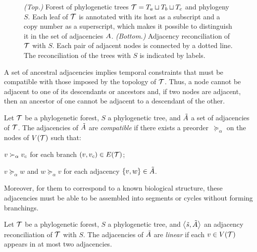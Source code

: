 \begin{figure}[htb]
    \capstart
    \centering
    
    \caption[Instance of and solution to an adjacency reconciliation problem]{
        \emph{(Top.)}
        Forest of phylogenetic trees \(\mathcal{T} = T_a \sqcup T_b \sqcup T_c\)
        and phylogeny \(S\).
        Each leaf of \(\mathcal{T}\) is annotated with its host as a subscript
        and a copy number as a superscript, which makes it possible to distinguish it in the set of adjacencies \(A\).
        \emph{(Bottom.)}
        Adjacency reconciliation of \(\mathcal{T}\) with \(S\).
        Each pair of adjacent nodes is connected by a dotted line.
        The reconciliation of the trees with \(S\) is indicated by labels.
    }
    \label{fig:reconciliation:adj-rec}
\end{figure}

A set of ancestral adjacencies implies temporal constraints that must be compatible with those imposed by the topology of \(\mathcal{T}\).
Thus, a node cannot be adjacent to one of its descendants or ancestors and, if two nodes are adjacent, then an ancestor of one cannot be adjacent to a descendant of the other.

\vspace{1ex}
\begin{definition}[Compatibility]\label{definition:adjrec-adj-compat}
    Let \(\mathcal{T}\) be a phylogenetic forest, \(S\) a phylogenetic tree, and \(\tilde{A}\) a set of adjacencies of \(\mathcal{T}\).
    The adjacencies of \(\tilde{A}\) are \emph{compatible} if there exists a preorder~\(\succeq_\alpha\) on the nodes of \(V(\mathcal{T})\) such that:
    \begin{condition}
        \item \(v \succ_\alpha v_c\) for each branch \((v, v_c) \in E(\mathcal{T})\);
        \item \(v \succeq_\alpha w\) and \(w \succeq_\alpha v\) for each adjacency \(\{v, w\} \in \tilde{A}\). \qedhere
    \end{condition}
\end{definition}

Moreover, for them to correspond to a known biological structure, these adjacencies must be able to be assembled into segments or cycles without forming branchings.

\begin{definition}[Linearity]\label{definition:adjrec-lin}
    Let \(\mathcal{T}\) be a phylogenetic forest, \(S\) a phylogenetic tree, and \(\left\langle\tilde{s}, \tilde{A}\right\rangle\) an adjacency reconciliation of \(\mathcal{T}\) with \(S\).
    The adjacencies of \(\tilde{A}\) are \emph{linear} if each \(v \in V(\mathcal{T})\) appears in at most two adjacencies.
\end{definition}

